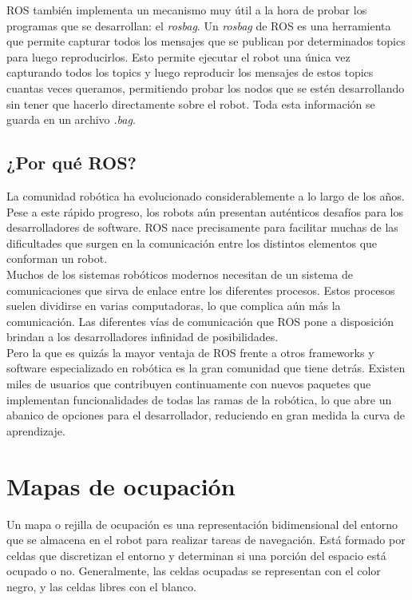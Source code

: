 ROS también implementa un mecanismo muy útil a la hora de probar los programas que se desarrollan: el \textit{rosbag}. Un \textit{rosbag} de ROS es una herramienta que permite capturar todos los mensajes que se publican por determinados topics para luego reproducirlos. Esto permite ejecutar el robot una única vez capturando todos los topics y luego reproducir los mensajes de estos topics cuantas veces queramos, permitiendo probar los nodos que se estén desarrollando sin tener que hacerlo directamente sobre el robot. Toda esta información se guarda en un archivo \textit{.bag}. \cite{roswiki}\\

\subsection{¿Por qué ROS?}

La comunidad robótica ha evolucionado considerablemente a lo largo de los años. Pese a  este rápido progreso, los robots aún presentan auténticos desafíos para los desarrolladores de software. ROS nace precisamente para facilitar muchas de las dificultades que surgen en la comunicación entre los distintos elementos que conforman un robot.\\

Muchos de los sistemas robóticos modernos necesitan de un sistema de comunicaciones que sirva de enlace entre los diferentes procesos. Estos procesos suelen dividirse en varias computadoras, lo que complica aún más la comunicación. Las diferentes vías de comunicación que ROS pone a disposición brindan a los desarrolladores infinidad de posibilidades.\\

Pero la que es quizás la mayor ventaja de ROS frente a otros frameworks y software especializado en robótica es la gran comunidad que tiene detrás. Existen miles de usuarios que contribuyen continuamente con nuevos paquetes que implementan funcionalidades de todas las ramas de la robótica, lo que abre un abanico de opciones para el desarrollador, reduciendo en gran medida la curva de aprendizaje.\\

\section{Mapas de ocupación}

Un mapa o rejilla de ocupación es una representación bidimensional del entorno que se almacena en el robot para realizar tareas de navegación. Está formado por celdas que discretizan el entorno y determinan si una porción del espacio está ocupado o no. Generalmente, las celdas ocupadas se representan con el color negro, y las celdas libres con el blanco.\\

